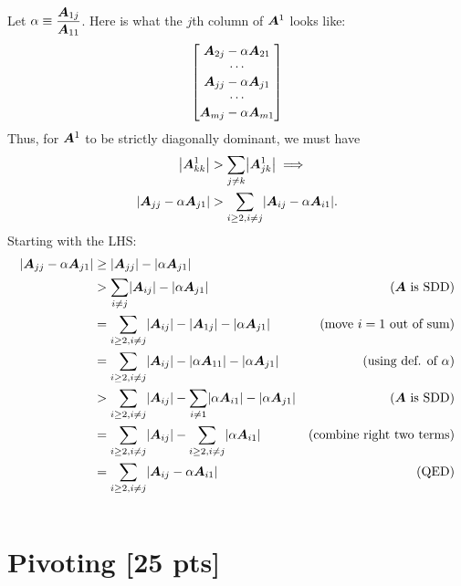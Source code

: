 \documentclass[twoside,10pt]{article}
\begin{document}
\begin{enumerate}
  Let $\alpha \equiv \dfrac{\bm{A}_{1 j}}{\bm{A}_{1 1}}$.
  Here is what the $j$th column of $\bm{A}^1$ looks like:
  $$\begin{bmatrix*}
    \mtx{A}_{2 j}-\alpha\mtx{A}_{2 1}\\
    \cdots\\
    \mtx{A}_{j j}-\alpha\mtx{A}_{j 1}\\
    \cdots\\
    \mtx{A}_{m j}-\alpha\mtx{A}_{m 1}
  \end{bmatrix*}$$
  Thus, for $\bm{A}^1$ to be strictly diagonally dominant, we must have
  \begin{align*}
    \left|\mtx{A}^1_{kk}\right| &> \sum \limits_{j \neq k} \left|\mtx{A}^1_{jk}\right| \implies\\
    \left|\mtx{A}_{j j}-\alpha\mtx{A}_{j 1}\right| &> \sum_{i \geq 2, i \neq j}\left|\mtx{A}_{i j}-\alpha\mtx{A}_{i 1}\right|.
  \end{align*}
  Starting with the LHS:
  \begin{align*}
    \left|\mtx{A}_{j j}-\alpha\mtx{A}_{j 1}\right| &\geq \left|\mtx{A}_{j j}\right|-\left|\alpha\mtx{A}_{j 1}\right|\\
    &> \sum_{i \neq j}\left|\mtx{A}_{i j}\right|-\left|\alpha\mtx{A}_{j 1}\right|&\text{($\mtx{A}$ is SDD)}\\
    &= \sum_{i \geq 2, i \neq j}\left|\mtx{A}_{i j}\right|-\left|\mtx{A}_{1 j}\right| -\left|\alpha\mtx{A}_{j 1}\right|&\text{(move $i = 1$ out of sum)}\\
    &= \sum_{i \geq 2, i \neq j}\left|\mtx{A}_{i j}\right|-\left|\alpha\mtx{A}_{1 1}\right| -\left|\alpha\mtx{A}_{j 1}\right|&\text{(using def. of $\alpha$)}\\
    &> \sum_{i \geq 2, i \neq j}\left|\mtx{A}_{i j}\right|-\sum_{i \neq 1}\left|\alpha\mtx{A}_{i 1}\right| -\left|\alpha\mtx{A}_{j 1}\right|&\text{($\mtx{A}$ is SDD)}\\
    &= \sum_{i \geq 2, i \neq j}\left|\mtx{A}_{i j}\right|-\sum_{i \geq 2, i \neq j}\left|\alpha\mtx{A}_{i 1}\right|&\text{(combine right two terms)}\\
    &= \sum_{i \geq 2, i \neq j}\left|\mtx{A}_{i j}-\alpha\mtx{A}_{i 1}\right|&\text{(QED)}
  \end{align*}
  \begin{align*}
  \end{align*}
\end{enumerate}

\section{Pivoting [25 pts]}
\end{document}
